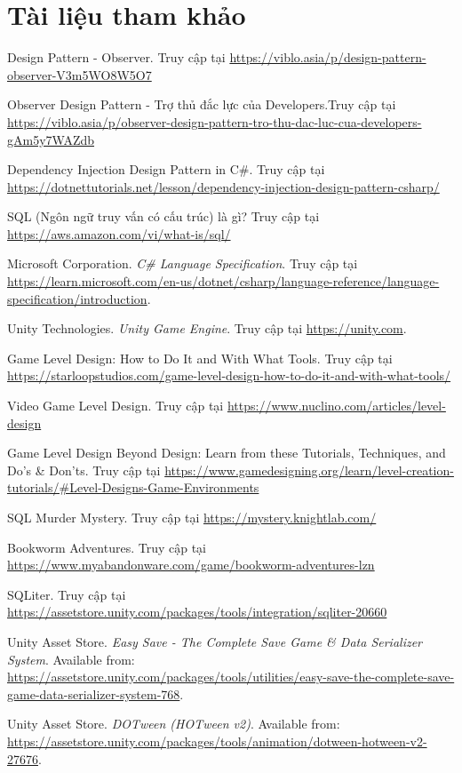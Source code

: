 \section{Tài liệu tham khảo}
\begin{thebibliography}{1}
		
	Design Pattern - Observer. Truy cập tại \url{https://viblo.asia/p/design-pattern-observer-V3m5WO8W5O7}
	
	Observer Design Pattern - Trợ thủ đắc lực của Developers.Truy cập tại
	\url{https://viblo.asia/p/observer-design-pattern-tro-thu-dac-luc-cua-developers-gAm5y7WAZdb}

	
	 Dependency Injection Design Pattern in C\#. Truy cập tại \url{https://dotnettutorials.net/lesson/dependency-injection-design-pattern-csharp/}
	
	SQL (Ngôn ngữ truy vấn có cấu trúc) là gì? Truy cập tại \url{https://aws.amazon.com/vi/what-is/sql/}
	
	Microsoft Corporation. \textit{C\# Language Specification}. Truy cập tại \url{https://learn.microsoft.com/en-us/dotnet/csharp/language-reference/language-specification/introduction}.
	
	Unity Technologies. \textit{Unity Game Engine}. Truy cập tại \url{https://unity.com}.
	
	
	 Game Level Design: How to Do It and With What Tools. Truy cập tại \url{https://starloopstudios.com/game-level-design-how-to-do-it-and-with-what-tools/}
	
	 Video Game Level Design. Truy cập tại \url{https://www.nuclino.com/articles/level-design}
	
	 Game Level Design Beyond Design: Learn from these Tutorials, Techniques, and Do’s \& Don’ts. Truy cập tại \url{https://www.gamedesigning.org/learn/level-creation-tutorials/#Level-Designs-Game-Environments}
	
	 SQL Murder Mystery. Truy cập tại \url{https://mystery.knightlab.com/}
	
	 Bookworm Adventures. Truy cập tại \url{https://www.myabandonware.com/game/bookworm-adventures-lzn}
	
	 SQLiter. Truy cập tại \url{https://assetstore.unity.com/packages/tools/integration/sqliter-20660}

	Unity Asset Store. \textit{Easy Save - The Complete Save Game \& Data Serializer System}. Available from: \url{https://assetstore.unity.com/packages/tools/utilities/easy-save-the-complete-save-game-data-serializer-system-768}.
	
	Unity Asset Store. \textit{DOTween (HOTween v2)}. Available from: \url{https://assetstore.unity.com/packages/tools/animation/dotween-hotween-v2-27676}.
	
	
	
\end{thebibliography}